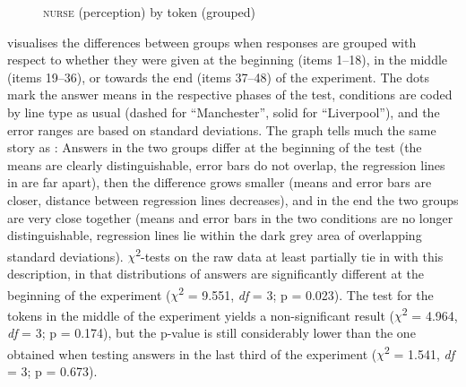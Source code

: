 \begin{figure}
	
		\resizebox{.49\linewidth}{!}{} 
	\caption{\textsc{nurse} (perception) by token (grouped)}
	\label{fig.line.nurse.ext.token}
\end{figure}

 visualises the differences between  groups when responses are grouped with respect to whether they were given at the beginning (items 1--18), in the middle (items 19--36), or towards the end (items 37--48) of the experiment.
The dots mark the answer means in the respective phases of the test,  conditions are coded by line type as usual (dashed for ``Manchester'', solid for ``Liverpool''), and the error ranges are based on standard deviations.
The graph tells much the same story as : Answers in the two groups differ at the beginning of the test (the means are clearly distinguishable, error bars do not overlap, the regression lines in  are far apart), then the difference grows smaller (means and error bars are closer, distance between regression lines decreases), and in the end the two groups are very close together (means and error bars in the two conditions are no longer distinguishable, regression lines lie within the dark grey area of overlapping standard deviations).
\(\chi\)\textsuperscript{2}-tests on the raw data at least partially tie in with this description, in that distributions of answers are significantly different at the beginning of the experiment (\(\chi\)\textsuperscript{2} = 9.551, \emph{df} = 3; p = 0.023).
The test for the tokens in the middle of the experiment yields a non-significant result (\(\chi\)\textsuperscript{2} = 4.964, \emph{df} = 3; p = 0.174), but the p-value is still considerably lower than the one obtained when testing answers in the last third of the experiment (\(\chi\)\textsuperscript{2} = 1.541, \emph{df} = 3; p = 0.673).

